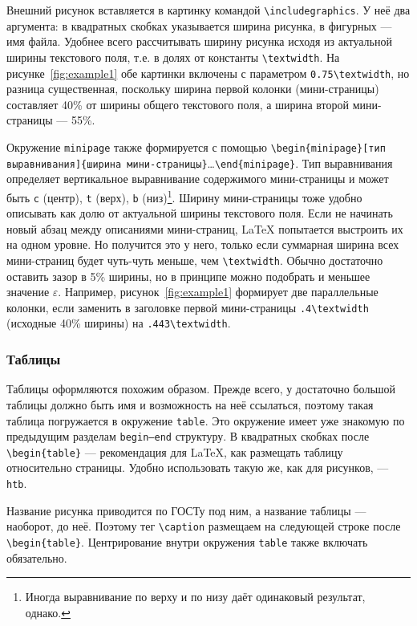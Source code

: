 \documentclass[14pt, russian]{scrartcl}
\begin{document}
Внешний рисунок вставляется в картинку командой \texttt{\textbackslash includegraphics}. У неё два аргумента: в квадратных скобках указывается ширина рисунка, в фигурных --- имя файла. Удобнее всего рассчитывать ширину рисунка исходя из актуальной ширины текстового поля, т.е. в долях от константы \texttt{\textbackslash textwidth}. На рисунке~\ref{fig:example1} обе картинки включены с параметром \texttt{0.75\textbackslash textwidth}, но разница существенная, поскольку ширина первой колонки (мини-страницы) составляет 40\% от ширины общего текстового поля, а ширина второй мини-страницы --- 55\%. 

Окружение \texttt{minipage} также формируется с помощью \texttt{\textbackslash begin\{minipage\}[тип выравнивания]\{ширина мини-страницы\}}\dots\texttt{\textbackslash end\{minipage\}}. Тип выравнивания определяет вертикальное выравнивание содержимого мини-страницы и может быть \texttt{c} (центр), \texttt{t} (верх), \texttt{b} (низ)\footnote{Иногда выравнивание по верху и по низу даёт одинаковый результат, однако.}. Ширину мини-страницы тоже удобно описывать как долю от актуальной ширины текстового поля. Если не начинать новый абзац между описаниями мини-страниц, \LaTeX{} попытается выстроить их на одном уровне. Но получится это у него, только если суммарная ширина всех мини-страниц будет чуть-чуть меньше, чем \texttt{\textbackslash textwidth}. Обычно достаточно оставить зазор в 5\% ширины, но в принципе можно подобрать и меньшее значение $\varepsilon$. Например, рисунок~\ref{fig:example1} формирует две параллельные колонки, если заменить в заголовке первой мини-страницы \texttt{.4\textbackslash textwidth} (исходные 40\% ширины) на \texttt{.443\textbackslash textwidth}. 

\subsubsection{Таблицы}

Таблицы оформляются похожим образом. Прежде всего, у достаточно большой таблицы должно быть имя и возможность на неё ссылаться, поэтому такая таблица погружается в окружение \texttt{table}. Это окружение имеет уже знакомую по предыдущим разделам \texttt{begin--end} структуру. В квадратных скобках после \texttt{\textbackslash begin\{table\}} --- рекомендация для \LaTeX, как размещать таблицу относительно страницы. Удобно использовать такую же, как для рисунков, --- \texttt{htb}.

Название рисунка приводится по ГОСТу под ним, а название таблицы --- наоборот, до неё. Поэтому тег \texttt{\textbackslash caption} размещаем на следующей строке после \texttt{\textbackslash begin\{table\}}. Центрирование внутри окружения \texttt{table} также включать обязательно.
\end{document}
